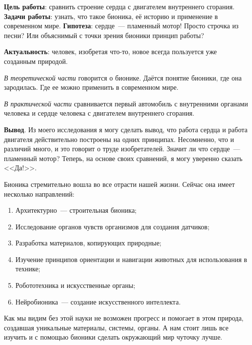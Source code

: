 


\makeProcTitleSchool



\textbf{Цель работы}: сравнить строение сердца с двигателем внутреннего сгорания.
\textbf{Задачи работы}: узнать, что такое бионика, её историю и применение в современном мире.
\textbf{Гипотеза}: сердце~--- пламенный мотор! Просто строчка из песни? Или объяснимый с точки зрения бионики принцип работы?

\textbf{Актуальность}: человек, изобретая что-то, новое всегда пользуется уже созданным природой.

\textit{В теоретической части} говорится о бионике. Даётся понятие бионики, где она зародилась. Где ее можно применить в современном  мире.

\textit{В практической части} сравнивается первый автомобиль с внутренними органами человека и сердце человека с двигателем внутреннего сгорания.

\textbf{Вывод}. Из моего исследования я могу сделать вывод, что работа сердца и работа двигателя действительно построены на одних принципах. Несомненно, что и различий много, и это говорит о труде изобретателей. Значит ли что сердце~--- пламенный мотор? Теперь, на основе своих сравнений, я могу уверенно сказать <<Да!>>.

Бионика стремительно вошла во все отрасти нашей жизни. Сейчас она имеет несколько направлений:
\begin{enumerate}[noitemsep]\vspace{-8pt}
\item Архитектурно~--- строительная бионика;
\item Исследование органов чувств организмов для создания датчиков;
\item Разработка материалов, копирующих природные;
\item Изучение принципов ориентации и навигации животных для использования в технике;
\item Робототехника и искусственные органы;
\item Нейробионика~--- создание искусственного интеллекта.
\end{enumerate}\vspace{-8pt}

Как мы видим без этой науки не возможен прогресс и помогает в этом природа, создавшая уникальные материалы, системы, органы. А нам стоит лишь все изучить и с помощью бионики сделать окружающий мир чуточку лучше.

